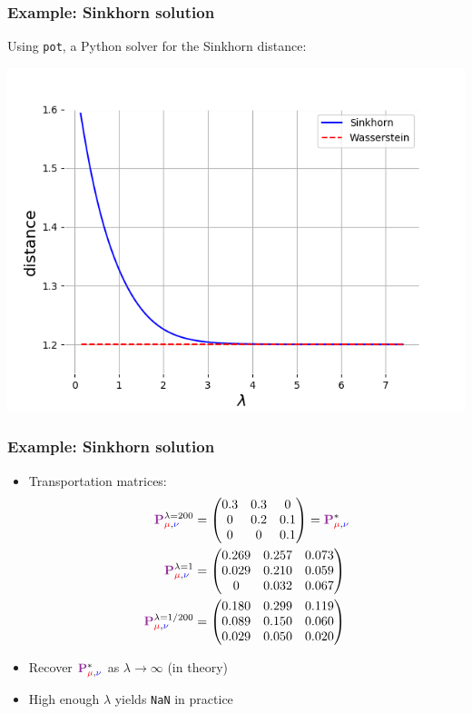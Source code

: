 \documentclass[mathserif,compress,xcolor={dvipsnames}]{beamer}
\renewcommand\;{\,}
\begin{document}
\begin{frame}\frametitle{Example: Sinkhorn solution}
Using \texttt{pot}, a Python solver for the Sinkhorn distance:
\begin{center}
\includegraphics[width=0.8\linewidth]{Figures/lambda.png}
\end{center}
\end{frame}

\begin{frame}\frametitle{Example: Sinkhorn solution}
\begin{itemize}
\item Transportation matrices:
\begin{align*}
{\color{Purple} \mathbf P}_{{\color{red} \mu}, {\color{blue} \nu}}^{\lambda = 200}
 & = 
\begin{pmatrix} 0.3 & 0.3 & 0 \\
				0 & 0.2 & 0.1 \\
				0 & 0 & 0.1
	\end{pmatrix}
	= {\color{Purple} \mathbf P}_{{\color{red} \mu}, {\color{blue} \nu}}^* \\
{\color{Purple} \mathbf P}_{{\color{red} \mu}, {\color{blue} \nu}}^{\lambda = 1}
 & = 
\begin{pmatrix}
	0.269 & 0.257 & 0.073 \\
    0.029 & 0.210 & 0.059 \\
    0 & 0.032 & 0.067 \\
\end{pmatrix} \\
{\color{Purple} \mathbf P}_{{\color{red} \mu}, {\color{blue} \nu}}^{\lambda = 1/200}
	& = 
\begin{pmatrix}
	0.180 & 0.299 &  0.119 \\
    0.089 & 0.150 & 0.060 \\
    0.029 & 0.050 & 0.020 \\
\end{pmatrix}
\end{align*}
\item
Recover ${\color{Purple} \mathbf P}_{{\color{red} \mu}, {\color{blue} \nu}}^*$ as $\lambda\to\infty$ (in theory) \Smiley
\medskip
\item
High enough $\lambda$ yields \texttt{NaN} in practice \Sadey
\end{itemize}
\end{frame}
\end{document}
